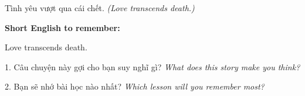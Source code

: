 \begin{baihoc}
Tình yêu vượt qua cái chết.
\textit{(Love transcends death.)}
\end{baihoc}

\begin{ghinhoanh}
\textbf{Short English to remember:}

Love transcends death.

\end{ghinhoanh}

\begin{tuhocnhanh}
1. Câu chuyện này gợi cho bạn suy nghĩ gì? \textit{What does this story make you think?}

2. Bạn sẽ nhớ bài học nào nhất? \textit{Which lesson will you remember most?}
\end{tuhocnhanh}
\ngancach
